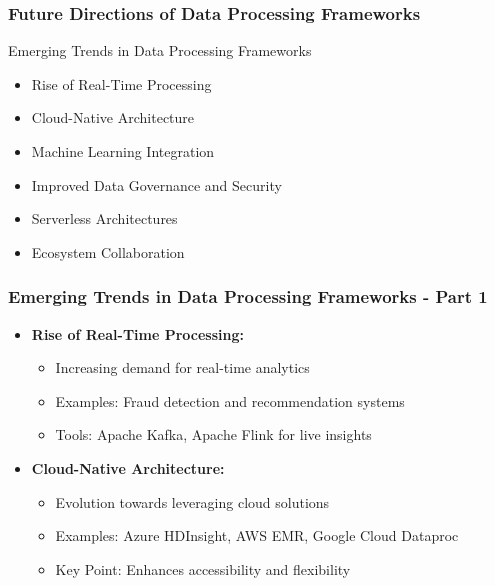 \documentclass[aspectratio=169]{beamer}
\begin{document}
\begin{frame}[fragile]
    \frametitle{Future Directions of Data Processing Frameworks}
    \begin{block}{Emerging Trends in Data Processing Frameworks}
        \begin{itemize}
            \item Rise of Real-Time Processing
            \item Cloud-Native Architecture
            \item Machine Learning Integration
            \item Improved Data Governance and Security
            \item Serverless Architectures
            \item Ecosystem Collaboration
        \end{itemize}
    \end{block}
\end{frame}

\begin{frame}[fragile]
    \frametitle{Emerging Trends in Data Processing Frameworks - Part 1}
    \begin{itemize}
        \item \textbf{Rise of Real-Time Processing:}
            \begin{itemize}
                \item Increasing demand for real-time analytics
                \item Examples: Fraud detection and recommendation systems
                \item Tools: Apache Kafka, Apache Flink for live insights
            \end{itemize}
        \item \textbf{Cloud-Native Architecture:}
            \begin{itemize}
                \item Evolution towards leveraging cloud solutions
                \item Examples: Azure HDInsight, AWS EMR, Google Cloud Dataproc
                \item Key Point: Enhances accessibility and flexibility
            \end{itemize}
    \end{itemize}
\end{frame}
\end{document}
